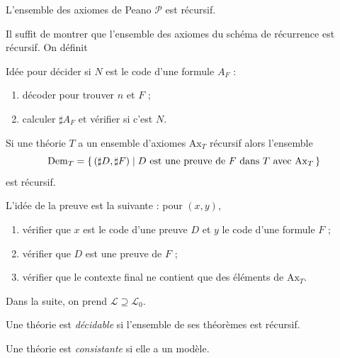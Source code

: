 \documentclass[./main]{subfiles}
\begin{document}
 \begin{lem}
   L'ensemble des axiomes de Peano $\mathcal{P}$ est récursif.
 \end{lem}
 \begin{prv}
   Il suffit de montrer que l'ensemble des axiomes du schéma de récurrence est récursif.
   On définit


  Idée pour décider si $N$ est le code d'une formule $A_F$ : 
  \begin{enumerate}
    \item décoder pour trouver $n$ et $F$ ;
    \item calculer $\sharp A_F$ et vérifier si c'est $N$.
  \end{enumerate}
 \end{prv}

 \begin{prop}
   Si une théorie $T$ a un ensemble d'axiomes $\mathrm{Ax}_T$ récursif alors l'ensemble \[
   \mathrm{Dem}_T = \mleft\{\, (\sharp D, \sharp F) \;\middle|\; \text{$D$ est une preuve de $F$ dans $T$ avec $\mathrm{Ax}_T$}\,\mright\} 
   \] 
   est récursif.
 \end{prop}
 \begin{prv}
   L'idée de la preuve est la suivante : pour $(x, y)$,
   \begin{enumerate}
     \item vérifier que $x$ est le code d'une preuve $D$ et $y$ le code d'une formule $F$ ;
     \item vérifier que $D$ est une preuve de $F$ ;
     \item vérifier que le contexte final ne contient que des éléments de $\mathrm{Ax}_T$.
   \end{enumerate}
 \end{prv}

 Dans la suite, on prend $\mathcal{L} \supseteq \mathcal{L}_0$.

 \begin{defn}
   Une théorie est \textit{décidable} si l'ensemble de ses théorèmes est récursif.
 \end{defn}

 \begin{rmk}[Rappel]
   Une théorie est \textit{consistante} si elle a un modèle.
 \end{rmk}
\end{document}
